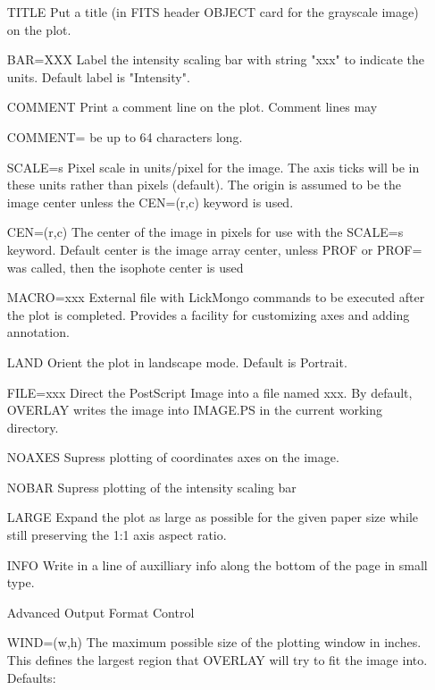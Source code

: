 \begin{itemize}
  \item[TITLE  ]{Put a title (in FITS header OBJECT card for the grayscale 
                 image) on the plot.}
  \item[BAR=XXX ]{Label the intensity scaling bar with string "xxx" to 
                  indicate the units. Default label is "Intensity".}
  \item[COMMENT ]{Print a comment line on the plot.  Comment lines may}
  \item[COMMENT= ]{be up to 64 characters long. }
  \item[SCALE=s ]{Pixel scale in units/pixel for the image.  The axis ticks 
                  will be in these units rather than pixels (default).  
                  The origin is assumed to be the image center unless the 
                  CEN=(r,c) keyword is used.}
  \item[CEN=(r,c) ]{The center of the image in pixels for use with the SCALE=s 
                  keyword.  Default center is the image array center, unless 
                  PROF or PROF= was called, then the isophote center is used }
  \item[MACRO=xxx]{External file with LickMongo commands to be executed 
                  after the plot is completed.  Provides a facility for 
                  customizing axes and adding annotation.}
  \item[LAND ]{Orient the plot in landscape mode.  Default is Portrait.}
  \item[FILE=xxx]{Direct the PostScript Image into a file named xxx.  By 
                  default, OVERLAY writes the image into IMAGE.PS in the 
                  current working directory.}
  \item[NOAXES ]{Supress plotting of coordinates axes on the image.}
  \item[NOBAR ]{Supress plotting of the intensity scaling bar}
  \item[LARGE]{Expand the plot as large as possible for the given paper size
               while still preserving the 1:1 axis aspect ratio.}
  \item[INFO]{Write in a line of auxilliary info along the bottom of 
              the page in small type.}
  \item[Advanced Output Format Control\hfill]{}
  \item[WIND=(w,h)]{The maximum possible size of the plotting window in inches.
                  This defines the largest region that OVERLAY will try to 
                  fit the image into.  Defaults:\newline
}
\end{itemize}
